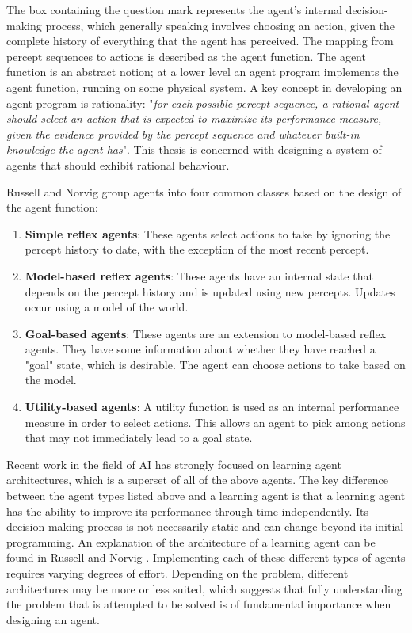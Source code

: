 The box containing the question mark represents the agent's internal decision-making process, which generally speaking involves choosing an action, given the complete history of everything that the agent has perceived. The mapping from percept sequences to actions is described as the agent function. The agent function is an abstract notion; at a lower level an agent program implements the agent function, running on some physical system. A key concept in developing an agent program is rationality: "\textit{for each possible percept sequence, a rational agent should select an action that is expected to maximize its performance measure, given the evidence provided by the percept sequence and whatever built-in knowledge the agent has}"\cite[p.~37]{AIAMA}. This thesis is concerned with designing a system of agents that should exhibit rational behaviour.\newline
 

Russell and Norvig group agents into four common classes based on the design of the agent function\cite[p.~47]{AIAMA}: 
\begin{enumerate}
    \item \textbf{Simple reflex agents}: These agents select actions to take by ignoring the percept history to date, with the exception of the most recent percept.
    \item \textbf{Model-based reflex agents}: These agents have an internal state that depends on the percept history and is updated using new percepts. Updates occur using a model of the world.
    \item \textbf{Goal-based agents}: These agents are an extension to model-based reflex agents. They have some information about whether they have reached a "goal" state, which is desirable. The agent can choose actions to take based on the model. 
    \item \textbf{Utility-based agents}: A utility function is used as an internal performance measure in order to select actions. This allows an agent to pick among actions that may not immediately lead to a goal state.
\end{enumerate}
Recent work in the field of AI has strongly focused on learning agent architectures, which is a superset of all of the above agents. The key difference between the agent types listed above and a learning agent is that a learning agent has the ability to improve its performance through time independently. Its decision making process is not necessarily static and can change beyond its initial programming. An explanation of the architecture of a learning agent can be found in Russell and Norvig \cite[p.~55]{AIAMA}. Implementing each of these different types of agents requires varying degrees of effort. Depending on the problem, different architectures may be more or less suited, which suggests that fully understanding the problem that is attempted to be solved is of fundamental importance when designing an agent.

